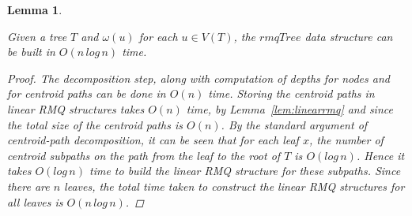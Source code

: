 \documentclass{article}
\newcommand{\weight}{\omega}
\newtheorem{rmqdatastructure}[incompatibility]{Lemma}
\begin{document}
    \begin{rmqdatastructure}
        \label{lem:rmqdatastructure}

        Given a tree $T$ and $\weight(u)$ for each $u \in V(T)$, the $rmqTree$ data structure can be built in $O(n\,log\,n)$ time.

        \begin{proof}
            The decomposition step, along with computation of depths for nodes and for centroid paths can be done in $O(n)$ time. Storing the centroid paths in linear RMQ structures takes $O(n)$ time, by Lemma~\ref{lem:linearrmq} and since the total size of the centroid paths is $O(n)$. By the standard argument of centroid-path decomposition, it can be seen that for each leaf $x$, the number of centroid subpaths on the path from the leaf to the root of $T$ is $O(log\,n)$. Hence it takes $O(log\,n)$ time to build the linear RMQ structure for these subpaths. Since there are $n$ leaves, the total time taken to construct the linear RMQ structures for all leaves is $O(n\,log\,n)$.
        \end{proof}
    \end{rmqdatastructure}
\end{document}
